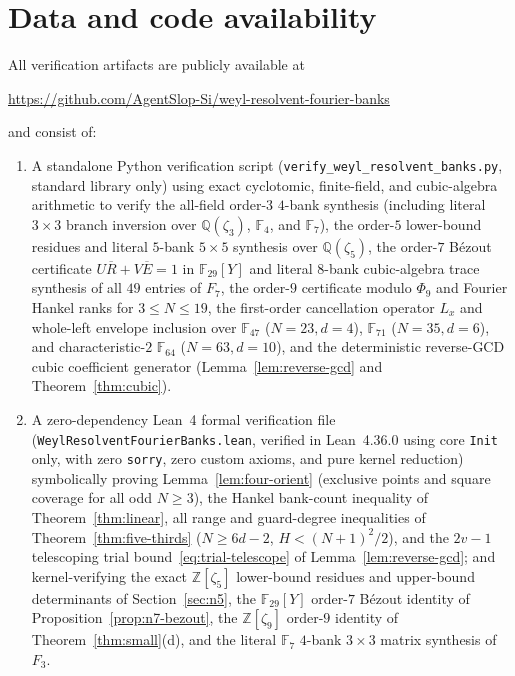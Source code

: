 \documentclass[11pt,reqno]{amsart}
\numberwithin{equation}{section}
\theoremstyle{definition}
\theoremstyle{remark}
\newcommand{\F}{\mathbb{F}}
\newcommand{\Q}{\mathbb{Q}}
\newcommand{\Z}{\mathbb{Z}}
\begin{document}
\section*{Data and code availability}
All verification artifacts are publicly available at
\begin{center}
\url{https://github.com/AgentSlop-Si/weyl-resolvent-fourier-banks}
\end{center}
and consist of:
\begin{enumerate}[label=(\arabic*),leftmargin=2em]
\item A standalone Python verification script (\texttt{verify\_weyl\_resolvent\_banks.py}, standard library only) using exact cyclotomic, finite-field, and cubic-algebra arithmetic to verify the all-field order-$3$ $4$-bank synthesis (including literal $3\times 3$ branch inversion over $\Q(\zeta_3)$, $\F_4$, and $\F_7$), the order-$5$ lower-bound residues and literal $5$-bank $5\times 5$ synthesis over $\Q(\zeta_5)$, the order-$7$ B\'ezout certificate $U\overline{R}+V\overline{E}=1$ in $\F_{29}[Y]$ and literal $8$-bank cubic-algebra trace synthesis of all $49$ entries of $F_7$, the order-$9$ certificate modulo $\Phi_9$ and Fourier Hankel ranks for $3\le N\le 19$, the first-order cancellation operator $L_x$ and whole-left envelope inclusion over $\F_{47}$ ($N=23,d=4$), $\F_{71}$ ($N=35,d=6$), and characteristic-$2$ $\F_{64}$ ($N=63,d=10$), and the deterministic reverse-GCD cubic coefficient generator (Lemma~\ref{lem:reverse-gcd} and Theorem~\ref{thm:cubic}).
\item A zero-dependency Lean~4 formal verification file (\texttt{WeylResolventFourierBanks.lean}, verified in Lean~4.36.0 using core \texttt{Init} only, with zero \texttt{sorry}, zero custom axioms, and pure kernel reduction) symbolically proving Lemma~\ref{lem:four-orient} (exclusive points and square coverage for all odd $N\ge 3$), the Hankel bank-count inequality of Theorem~\ref{thm:linear}, all range and guard-degree inequalities of Theorem~\ref{thm:five-thirds} ($N\ge 6d-2$, $H<(N+1)^2/2$), and the $2v-1$ telescoping trial bound~\eqref{eq:trial-telescope} of Lemma~\ref{lem:reverse-gcd}; and kernel-verifying the exact $\Z[\zeta_5]$ lower-bound residues and upper-bound determinants of Section~\ref{sec:n5}, the $\F_{29}[Y]$ order-$7$ B\'ezout identity of Proposition~\ref{prop:n7-bezout}, the $\Z[\zeta_9]$ order-$9$ identity of Theorem~\ref{thm:small}(d), and the literal $\F_7$ $4$-bank $3\times 3$ matrix synthesis of $F_3$.
\end{enumerate}



\end{document}
